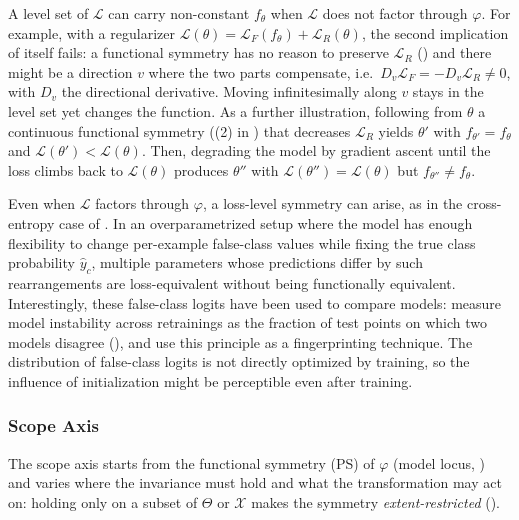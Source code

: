\documentclass[mathematics,review,submit,moreauthors]{Definitions/mdpi}
\begin{document}
\begin{Example}\label{ex:loss-level-symmetry-regularization}
    A level set of $\mathcal{L}$ can carry non-constant $f_\theta$ when $\mathcal{L}$ does not factor through $\varphi$.
    For example, with a regularizer $\mathcal{L}(\theta)=\mathcal{L}_F(f_\theta)+\mathcal{L}_R(\theta)$, the second implication of  itself fails: a functional symmetry has no reason to preserve $\mathcal{L}_R$ () and there might be a direction $v$ where the two parts compensate, i.e.\ $D_v\mathcal{L}_F=-D_v\mathcal{L}_R\neq 0$, with $D_v$ the directional derivative.
    Moving infinitesimally along $v$ stays in the level set yet changes the function.
    As a further illustration, following from $\theta$ a continuous functional symmetry ((2) in ) that decreases $\mathcal{L}_R$ yields $\theta'$ with $f_{\theta'}=f_\theta$ and $\mathcal{L}(\theta')<\mathcal{L}(\theta)$.
    Then, degrading the model by gradient ascent until the loss climbs back to $\mathcal{L}(\theta)$ produces $\theta''$ with $\mathcal{L}(\theta'')=\mathcal{L}(\theta)$ but $f_{\theta''}\neq f_\theta$.
\end{Example}

\begin{Remark}
    Even when $\mathcal{L}$ factors through $\varphi$, a loss-level symmetry can arise, as in the cross-entropy case of .
    In an overparametrized setup where the model has enough flexibility to change per-example false-class values while fixing the true class probability $\hat y_c$, multiple parameters whose predictions differ by such rearrangements are loss-equivalent without being functionally equivalent.
    Interestingly, these false-class logits have been used to compare models: \citet{zhuang2022pmls} measure model instability across retrainings as the fraction of test points on which two models disagree (), and \citet{godinot2024} use this principle as a fingerprinting technique.
    The distribution of false-class logits is not directly optimized by training, so the influence of initialization might be perceptible even after training.
\end{Remark}


\subsubsection{Scope Axis}\label{sec:scope-param-space-symmetries}
The scope axis starts from the functional symmetry (PS) of $\varphi$ (model locus, ) and varies where the invariance must hold and what the transformation may act on: holding only on a subset of $\Theta$ or $\mathcal X$ makes the symmetry \emph{extent-restricted} ().
\end{document}
